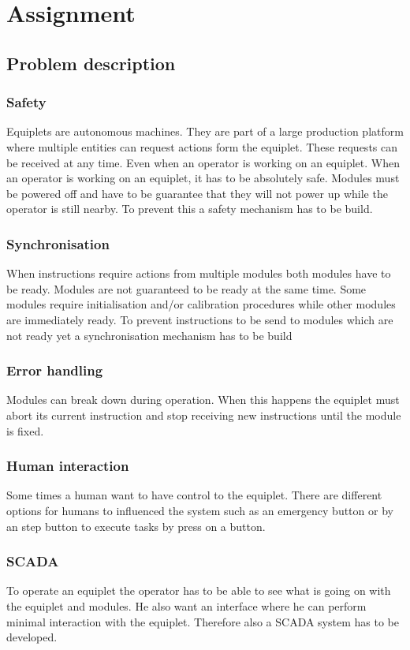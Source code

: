 \documentclass[12pt,a4paper]{report}
\begin{document}
\chapter{Assignment}
\section{Problem description}
\subsection{Safety}
Equiplets are autonomous machines. 
They are part of a large production platform where multiple entities can request actions form the equiplet.
These requests can be received at any time.
Even when an operator is working on an equiplet.
When an operator is working on an equiplet, it has to be absolutely safe.
Modules must be powered off and have to be guarantee that they will not power up while the operator is still nearby.
To prevent this a safety mechanism has to be build.
\subsection{Synchronisation}
When instructions require actions from multiple modules both modules have to be ready.
Modules are not guaranteed to be ready at the same time. Some modules require initialisation  and/or calibration procedures while other modules are immediately ready.
To prevent instructions to be send to modules which are not ready yet a synchronisation mechanism has to be build
\subsection{Error handling}
Modules can break down during operation. When this happens the equiplet must abort its current instruction and stop receiving new instructions until the module is fixed.
\subsection{Human interaction}
Some times a human want to have control to the equiplet. There are different options for humans to influenced the system such as an emergency button or by an step button to execute tasks by press on a button.

\subsection{SCADA}
To operate an equiplet the operator has to be able to see what is going on with the equiplet and modules. He also want an interface where he can perform minimal interaction with the equiplet. Therefore also a SCADA system has to be developed.
\end{document}
